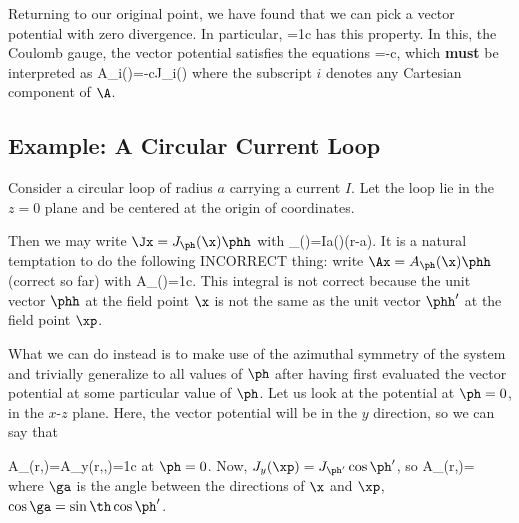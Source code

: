 {Returning to our original point, we have found that we can pick a vector
potential with zero divergence. In particular,
\beq
\Ax=\frac1c\inivp\frac{\J(\xp)}\xxpa
\eeq
has this property. In this, the Coulomb gauge, the vector potential
satisfies the equations
\beq
\lap\Ax=-\frac{4\pi}c\Jx,
\eeq
which {\bf{must}} be interpreted as
\beq
\lap A_i(\x)=-\frac{4\pi}cJ_i(\x)
\eeq
where the subscript $i$ denotes any Cartesian component of $\A$.

\subsection{Example: A Circular Current Loop}

Consider a circular loop of radius $a$ carrying a current $I$. Let the loop
lie in the $z=0$ plane and be centered at the origin of coordinates. 

\centerline{}

\noindent Then
we may write $\Jx=J_\ph(\x)\phh$ with
\beq
\J_\ph(\x)=\frac Ia\de(\cos\th)\de(r-a).
\eeq
It is a natural temptation to do the following INCORRECT thing:
write $\Ax=A_\ph(\x)\phh$ (correct so far) with
\beq
A_\ph(\x)=\frac1c\inivp{}\xxpa.
\eeq
This integral is not correct because the unit vector $\phh$ at the field
point $\x$ is not the same as the unit vector $\phh'$ at the field point
$\xp$.

What we can do instead is to make use of the azimuthal symmetry of the
system and trivially generalize to all values of $\ph$ after having first
evaluated the vector potential at some particular value of $\ph$.
Let us look at the potential at $\ph=0$, \ie in the $x$-$z$ plane. Here,
the vector potential will be in the $y$ direction, so we can say that

\beq
A_\ph(r,\th)=A_y(r,\th,)=\frac1c\inivp{}\xxpa
\eeq
at $\ph=0$. Now, $J_y(\xp)=J_{\ph'}\cos\ph'$, so
\beq
A_\ph(r,\ph)=\inivp{}
\eeq
where $\ga$ is the angle between the directions of $\x$ and $\xp$,
$\cos\ga=\sin\th\cos\ph'$. 

}
